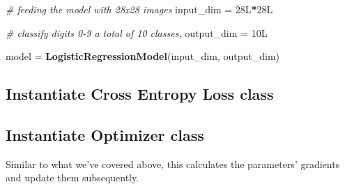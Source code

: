 \documentclass[]{book}
\newenvironment{Shaded}{\begin{snugshade}}{\end{snugshade}}
\newcommand{\CommentTok}[1]{\textcolor[rgb]{0.56,0.35,0.01}{\textit{#1}}}
\newcommand{\DataTypeTok}[1]{\textcolor[rgb]{0.13,0.29,0.53}{#1}}
\newcommand{\FloatTok}[1]{\textcolor[rgb]{0.00,0.00,0.81}{#1}}
\newcommand{\KeywordTok}[1]{\textcolor[rgb]{0.13,0.29,0.53}{\textbf{#1}}}
\newcommand{\NormalTok}[1]{#1}
\newcommand{\OperatorTok}[1]{\textcolor[rgb]{0.81,0.36,0.00}{\textbf{#1}}}
\newcommand{\StringTok}[1]{\textcolor[rgb]{0.31,0.60,0.02}{#1}}
\begin{document}
\begin{Shaded}
\begin{Highlighting}[]
\CommentTok{# feeding the model with 28x28 images}
\NormalTok{input_dim =}\StringTok{ }\NormalTok{28L}\OperatorTok{*}\NormalTok{28L}

\CommentTok{# classify digits 0-9 a total of 10 classes,}
\NormalTok{output_dim =}\StringTok{ }\NormalTok{10L}

\NormalTok{model =}\StringTok{ }\KeywordTok{LogisticRegressionModel}\NormalTok{(input_dim, output_dim)}
\end{Highlighting}
\end{Shaded}

\hypertarget{instantiate-cross-entropy-loss-class}{%
\subsection{Instantiate Cross Entropy Loss class}\label{instantiate-cross-entropy-loss-class}}

\begin{Shaded}
\end{Shaded}

\hypertarget{instantiate-optimizer-class}{%
\subsection{Instantiate Optimizer class}\label{instantiate-optimizer-class}}

Similar to what we've covered above, this calculates the parameters' gradients and update them subsequently.

\begin{Shaded}
\end{Shaded}
\end{document}
